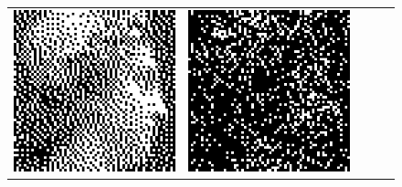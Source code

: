 \begin{figure}
\begin{tabular}{c c c c c}
		\includegraphics[width=\tilewidth,interpolate=false]{media/chp2/associative_memory/hopfield/07_00_orig_scaled_crushed.png}&%
		\includegraphics[width=\tilewidth,interpolate=false]{media/chp2/associative_memory/hopfield/07_01_noise_scaled_crushed.png}&%

\end{tabular}
\end{figure}
